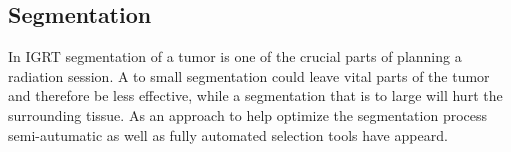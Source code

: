 \subsection{Segmentation}
\label{Segmentation}
In IGRT segmentation of a tumor is one of the crucial parts of planning a radiation session. A to small segmentation could leave vital parts of the tumor and therefore be less effective, while a segmentation that is to large will hurt the surrounding tissue.
As an approach to help optimize the segmentation process semi-autumatic as well as fully automated selection tools have appeard.
\cite{heckelSketchBasedEditingTools2013}
